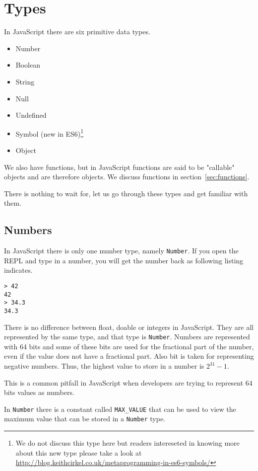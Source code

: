 \section{Types}\label{sec:types}
In JavaScript there are six primitive data types.
\begin{itemize}
\item Number
\item Boolean
\item String
\item Null
\item Undefined
\item Symbol (new in ES6)\footnote{We do not discuss this type here but readers intereseted in knowing more about this new type please take a look at \url{http://blog.keithcirkel.co.uk/metaprogramming-in-es6-symbols/}}
\item Object
\end{itemize}

We also have functions, but in JavaScript functions are said to be "callable" objects and are therefore objects. We discuss functions in section~\ref{sec:functions}.

There is nothing to wait for, let us go through these types and get familiar with them.

\subsection{Numbers}\label{sub:numbers}
In JavaScript there is only one number type, namely \texttt{Number}. If you open the REPL and type in a number, you will get the number back as following listing indicates.

\begin{lstlisting}
> 42
42
> 34.3
34.3
\end{lstlisting}

There is no difference between float, doable or integers in JavaScript. They are all represented by the same type, and that type is \texttt{Number}. Numbers are represented with 64 bits and  some of these bits are used for the fractional part of the number, even if the value does not have a fractional part. Also bit is taken for representing negative numbers. Thus, the highest value to store in a number is $2^{31} - 1$.

This is a common pitfall in JavaScript when developers are trying to represent 64 bits values as numbers.

In \texttt{Number} there is a constant called \texttt{MAX\_VALUE} that can be used to view the maximum value that can be stored in a \texttt{Number} type.

